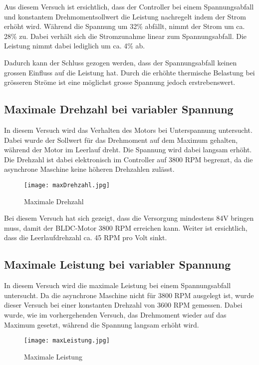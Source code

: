 Aus diesem Versuch ist ersichtlich, dass der Controller bei einem Spannungsabfall und konstantem Drehmomentsollwert die Leistung nachregelt indem der Strom erhöht wird. Während die Spannung um 32\% abfällt, nimmt der Strom um ca. 28\% zu. Dabei verhält sich die Stromzunahme linear zum Spannungsabfall. Die Leistung nimmt dabei lediglich um ca. 4\% ab.

Dadurch kann der Schluss gezogen werden, dass der Spannungsabfall keinen grossen Einfluss auf die Leistung hat. Durch die erhöhte thermische Belastung bei grösseren Ströme ist eine möglichst grosse Spannung jedoch erstrebenswert.

\subsection{Maximale Drehzahl bei variabler Spannung}\label{subsec:DrehzahlSpanungsabfall}
In diesem Versuch wird das Verhalten des Motors bei Unterspannung untersucht. Dabei wurde der Sollwert für das Drehmoment auf dem Maximum gehalten, während der Motor im Leerlauf dreht. Die Spannung wird dabei langsam erhöht. Die Drehzahl ist dabei elektronisch im Controller auf 3800 RPM begrenzt, da die asynchrone Maschine keine höheren Drehzahlen zulässt.

\begin{figure}[H]
	\centering
	\texttt{[image: maxDrehzahl.jpg]}
	\caption{Maximale Drehzahl}\label{fig:maxDrehzahl}
\end{figure}

Bei diesem Versuch hat sich gezeigt, dass die Versorgung mindestens 84V bringen muss, damit der BLDC-Motor 3800 RPM erreichen kann. Weiter ist ersichtlich, dass die Leerlaufdrehzahl ca. 45 RPM pro Volt sinkt.


\subsection{Maximale Leistung bei variabler Spannung}\label{subsec:LeistungSpannungsabfall}
In diesem Versuch wird die maximale Leistung bei einem Spannungsabfall untersucht. Da die asynchrone Maschine nicht für 3800 RPM ausgelegt ist, wurde dieser Versuch bei einer konstanten Drehzahl von 3600 RPM gemessen. Dabei wurde, wie im vorhergehenden Versuch, das Drehmoment wieder auf das Maximum gesetzt, während die Spannung langsam erhöht wird.


\begin{figure}[H]
	\centering
	\texttt{[image: maxLeistung.jpg]}
	\caption{Maximale Leistung}\label{fig:maxLeistung}
\end{figure}

